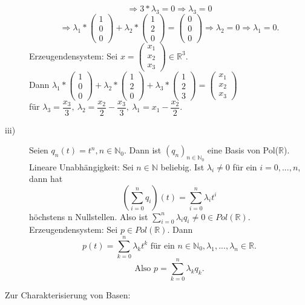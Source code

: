 \documentclass{scrbook}
\begin{document}
\begin{description}
\[\]
\[
\Rightarrow 3*\lambda_3 = 0 \Rightarrow \lambda_3 = 0
\]
\[
\Rightarrow \lambda_1 *\left(\begin{array}{c}1\\0\\0\end{array}\right) +\lambda_2 *\left(\begin{array}{c}1\\2\\0\end{array}\right) = \left(\begin{array}{c}0\\0\\0\end{array}\right) \Rightarrow \lambda_2=0\Rightarrow \lambda_1=0.
\]
Erzeugendensystem:
Sei $x =\left(\begin{array}{c}x_1\\x_2\\x_3\end{array}\right)\in \mathbb{R}^3 $.\\Dann $\lambda_1 * \left(\begin{array}{c}1\\0\\0\end{array}\right) +\lambda_2 *\left(\begin{array}{c}1\\2\\0\end{array}\right)+\lambda_3*\left(\begin{array}{c}1\\2\\3\end{array}\right) = \left(\begin{array}{c}x_1\\x_2\\x_3\end{array}\right)$\\für $\lambda_3 = \dfrac{x_3}{3},\ \lambda_2 = \dfrac{x_2}{2}-\dfrac{x_3}{3},\  \lambda_1 = x_1-\dfrac{x_2}{2}$.
\item[iii)] Seien $q_n(t)=t^n,n\in \mathbb{N}_0$. Dann ist $(q_n)_{n\in \mathbb{N}_0}$ eine Basis von Pol($\mathbb{R}$).\\
Lineare Unabhängigkeit:  Sei $n \in \mathbb{N}$ beliebig. Ist $\lambda_i \neq 0$ für ein $i=0,...,n$, dann hat 
\[
\left(
\sum^n_{i=0}q_i
\right)(t)=\sum^n_{i=0}\lambda_i t^i
\]
höchstens n Nullstellen. Also ist $\sum^n_{i=0}\lambda_i q_i \neq 0 \in Pol(\mathbb{R})$.\\
Erzeugendensystem: Sei $p\in Pol(\mathbb{R})$. Dann
\[
p(t) = \sum^n_{k=0}\lambda_k t^k \text{ für ein }n\in \mathbb{N}_0, \lambda_1,...,\lambda_n \in \mathbb{R.} 
\]
\[
\text{Also } p=\sum^n_{k=0} \lambda_kq_k.
\]
\end{description}
Zur Charakterisierung von Basen:
\end{document}
